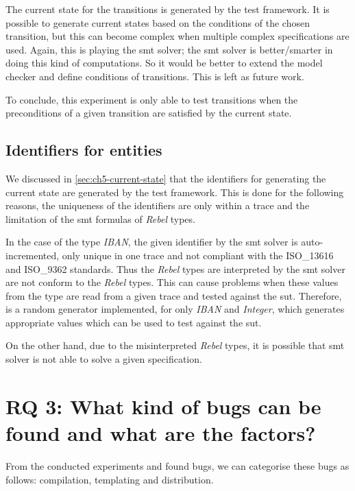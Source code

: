 The current state for the transitions is generated by the test framework. It is possible to generate current states based on the conditions of the chosen transition, but this can become complex when multiple complex specifications are used. Again, this is playing the \gls{smt} solver; the \gls{smt} solver is better/smarter in doing this kind of computations. So it would be better to extend the model checker and define conditions of transitions. This is left as future work.

To conclude, this experiment is only able to test transitions when the preconditions of a given transition are satisfied by the current state.


\subsection{Identifiers for entities}
We discussed in \autoref{sec:ch5-current-state} that the identifiers for generating the current state are generated by the test framework. This is done for the following reasons, the uniqueness of the identifiers are only within a trace and the limitation of the \gls{smt} formulas of \textit{Rebel} types.

In the case of the type \textit{IBAN}, the given identifier by the \gls{smt} solver is auto-incremented, only unique in one trace and not compliant with the ISO\_13616 and ISO\_9362 standards. Thus the \textit{Rebel} types are interpreted by the \gls{smt} solver are not conform to the \textit{Rebel} types. This can cause problems when these values from the type are read from a given trace and tested against the \gls{sut}. Therefore, is a random generator implemented, for only \textit{IBAN} and \textit{Integer}, which generates appropriate values which can be used to test against the \gls{sut}.

On the other hand, due to the misinterpreted \textit{Rebel} types, it is possible that \gls{smt} solver is not able to solve a given specification.


\section{RQ 3: What kind of bugs can be found and what are the factors?}

From the conducted experiments and found bugs, we can categorise these bugs as follows: compilation, templating and distribution.

